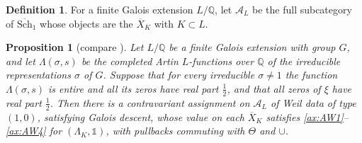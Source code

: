\documentclass[11pt]{amsart}
\theoremstyle{plain}
\newtheorem{proposition}[theorem]{Proposition}
\theoremstyle{definition}
\newtheorem{definition}[theorem]{Definition}
\theoremstyle{remark}
\numberwithin{equation}{section}
\newcommand{\Q}{\mathbb{Q}}
\newcommand{\Xbar}{\overline{X}}
\newcommand{\cA}{\mathcal{A}}
\newcommand{\Schbar}{\overline{\mathrm{Sch}}}
\begin{document}
\begin{definition}\label{def:AL}
For a finite Galois extension $L/\Q$, let $\cA_L$ be the full
subcategory of $\Schbar_1$ whose objects are the $\Xbar_K$ with $K\subset
L$.
\end{definition}

\begin{proposition}[{compare \cite[Theorem~2.15]{Deninger2025BSDDedekind}}]%
\label{prop:class-converse}
Let $L/\Q$ be a finite Galois extension with group $G$, and let
$\Lambda(\sigma,s)$ be the completed Artin $L$-functions over $\Q$ of
the irreducible representations $\sigma$ of $G$. Suppose that for every
irreducible $\sigma\ne1$ the function $\Lambda(\sigma,s)$ is entire and
all its zeros have real part $\tfrac12$, and that all zeros of $\xi$
have real part $\tfrac12$. Then there is a contravariant assignment on
$\cA_L$ of Weil data of type $(1,0)$, satisfying Galois descent, whose
value on each $\Xbar_K$ satisfies \ref{ax:AW1}--\ref{ax:AW4} for
$(\Lambda_K,\mathbb 1)$, with pullbacks commuting with $\Theta$ and
$\cup$.
\end{proposition}
\end{document}

